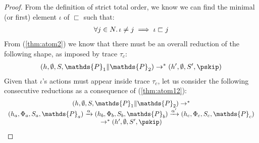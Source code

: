 \begin{thm}
{\begin{proof}
From the definition of strict total order, we know we can find the minimal (or first) element $\iota$ of $\sqsubset$ such that:
\begin{gather}
	\label{thm:atom3} \forall j \in N \ldotp \iota \neq j \implies \iota \sqsubset j
\end{gather}
From (\ref{thm:atom2}) we know that there must be an overall reduction of the following shape, as imposed by trace $\tau_c$:
	\begin{gather}
		\label{thm:atom12}
		(h, \emptyset, S, \mathds{P}_1 \| \mathds{P}_2) \rightarrow^* (h', \emptyset, S', \pskip)
	\end{gather}
Given that $\iota$'s actions must appear inside trace $\tau_c$, let us consider the following consecutive reductions as a consequence of (\ref{thm:atom12}):
\begin{gather}
	\label{thm:atom14}
	\begin{array}{c}
		(h, \emptyset, S, \mathds{P}_1 \| \mathds{P}_2)
			\rightarrow^* \\
		(h_a, \Phi_a, S_a, \mathds{P}_a)
			\xrightarrow{\alpha}
		(h_b, \Phi_b, S_b, \mathds{P}_b)
			\xrightarrow{\alpha'}
		(h_c, \Phi_c, S_c, \mathds{P}_c) \\
			\rightarrow^*
		(h', \emptyset, S', \pskip)
	\end{array}
\end{gather}
	

\end{proof}}
\end{thm}

